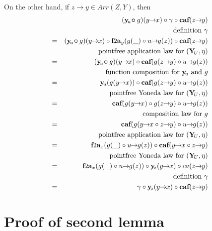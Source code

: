\documentclass[journal]{journal}
\newcommand{\bcirc}{\bm{\circ}}
\def\edefn{\endgroup\par\pagebreak[2]\addvspace{\medskipamount}}
\let\eprf=\edefn
\newcommand{\arrow}[2]{#1\!\!\rightarrow\!\!#2}
\newcommand{\cfta}[1]{\mbox{{\normalsize {\bf f}}{\small 2}{\normalsize {\bf a}}}_{#1}}
\newcommand{\Y}{\mbox{\bf Y}}
\newcommand{\y}{\mbox{\bf y}}
\newcommand{\caf}{\mbox{\bf caf}}
\begin{document}
On the other hand, if $\arrow{z}{y} \in Arr(Z,Y)$, then
\begin{eqnarray*}
&   & \!\!\!\!\!\!\!\!\!\!\!\!\!\!\!\! (\y\!_{u} \!\bcirc g)(\arrow{y}{x}) \circ \gamma \circ \caf(\arrow{z}{y}) \\
&   & \mbox{definition } \gamma \\
& = & (\y\!_{u} \!\bcirc g)(\arrow{y}{x}) \circ \cfta{y}(g(\_) \circ \arrow{u}{g(z)}) \circ \caf(\arrow{z}{y}) \\
&   & \mbox{pointfree application law for } (\Y\!_U, \eta) \\      
& = & (\y\!_{u} \!\bcirc g)(\arrow{y}{x}) \circ \caf(g(\arrow{z}{y}) \circ \arrow{u}{g(z)}) \\
&   & \mbox{function composition for } \y\!_{u} \mbox{ and } g \\      
& = & \y\!_{u}(g(\arrow{y}{x})) \circ \caf(g(\arrow{z}{y}) \circ \arrow{u}{g(z)}) \\
&   & \mbox{pointfree Yoneda law for } (\Y\!_U, \eta) \\      
& = & \caf(g(\arrow{y}{x}) \circ g(\arrow{z}{y}) \circ \arrow{u}{g(z)}) \\
&   & \mbox{composition law for } g \\
& = & \caf(g(\arrow{y}{x} \circ \arrow{z}{y}) \circ \arrow{u}{g(z)}) \\
&   & \mbox{pointfree application law for } (\Y\!_U, \eta) \\      
& = & \cfta{x}(g(\_) \circ \arrow{u}{g(z)}) \circ \caf(\arrow{y}{x} \circ \arrow{z}{y}) \\
&   & \mbox{pointfree Yoneda law for } (\Y\!_U, \eta) \\      
& = & \cfta{x}(g(\_) \circ \arrow{u}{g(z)}) \circ \y\!_{z}(\arrow{y}{x}) \circ ca(\arrow{z}{y}) \\
&   & \mbox{definition } \gamma \\
& = & \gamma \circ \y\!_{z}(\arrow{y}{x}) \circ \caf(\arrow{z}{y})
\end{eqnarray*}
\eprf

\newpage

\section{Proof of second lemma}
\end{document}
